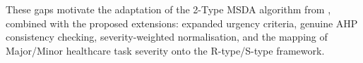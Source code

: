 These gaps motivate the adaptation of the 2-Type MSDA algorithm from \cite{oomori2026strategyproof}, combined with the proposed extensions: expanded urgency criteria, genuine AHP consistency checking, severity-weighted normalisation, and the mapping of Major/Minor healthcare task severity onto the R-type/S-type framework.